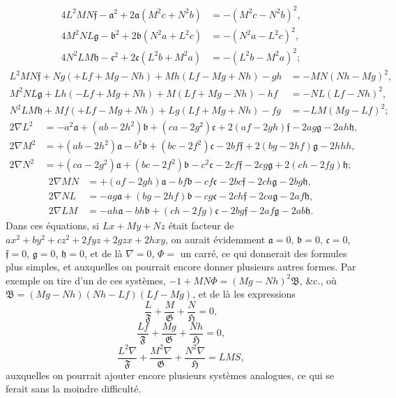 \documentclass[11pt]{article}
\begin{document}
\begin{align*}
4 L^{2} M N\mathfrak{f} - \mathfrak{a}^{2} + 2 \mathfrak{a}(M^{2} c + N^{2} b) &= -(M^{2} c - N^{2} b)^{2},\\
4 M^{2} N L\mathfrak{g} - \mathfrak{b}^{2} + 2 \mathfrak{b}(N^{2} a + L^{2} c) &= -(N^{2} a - L^{2} c)^{2},\\
4 N^{2} L M\mathfrak{h} - \mathfrak{c}^{2} + 2 \mathfrak{c}(L^{2} b + M^{2} a) &= -(L^{2} b - M^{2} a)^{2};
\end{align*}
\begin{align*}
L^{2} M N\mathfrak{f} + N g(+ L f + M g - N h) + M h(L f - M g + N h) - g h &= -M N(N h - M g)^{2},\\
M^{2} N L\mathfrak{g} + L h(-L f + M g + N h) + M(L f + M g - N h) - h f &= -N L(L f - N h)^{2},\\
N^{2} L M\mathfrak{h} + M f(+ L f - M g + N h) + L g(L f + M g + N h) - f g &= -L M(M g - L f)^{2};
\end{align*}
\begin{align*}
2 \nabla L^{2} &= -a^{2}\mathfrak{a} + (a b - 2 h^{2})\mathfrak{b} + (c a - 2 g^{2})\mathfrak{c} + 2(a f - 2 g h)\mathfrak{f} - 2 a g\mathfrak{g} - 2 a h\mathfrak{h},\\
2 \nabla M^{2} &= +(a b - 2 h^{2})\mathfrak{a} - b^{2}\mathfrak{b} + (b c - 2 f^{2})\mathfrak{c} - 2 b f\mathfrak{f} + 2(b g - 2 h f)\mathfrak{g} - 2 h h h,\\
2 \nabla N^{2} &= +(c a - 2 g^{2})\mathfrak{a} + (b c - 2 f^{2})\mathfrak{b} - c^{2}\mathfrak{c} - 2 c f\mathfrak{f} - 2 c g\mathfrak{g} + 2(c h - 2 f g)\mathfrak{h};
\end{align*}
\begin{align*}
2 \nabla M N &= +(a f - 2 g h)\mathfrak{a} - b f\mathfrak{b} - c f\mathfrak{c} - 2 b c\mathfrak{f} - 2 c h\mathfrak{g} - 2 b g\mathfrak{h},\\
2 \nabla N L &= -a g\mathfrak{a} + (b g - 2 h f)\mathfrak{b} - c g\mathfrak{c} - 2 c h\mathfrak{f} - 2 c a\mathfrak{g} - 2 a f\mathfrak{h},\\
2 \nabla L M &= -a h\mathfrak{a} - b h\mathfrak{b} + (c h - 2 f g)\mathfrak{c} - 2 b g\mathfrak{f} - 2 a f\mathfrak{g} - 2 a b\mathfrak{h}.
\end{align*}
Dans ces \'equations, si $L x + M y + N z$ \'etait facteur de $a x^{2} + b y^{2} + c z^{2} + 2 f y z + 2 g z x + 2 h x y$,
on aurait \'evidemment $\mathfrak{a} = 0$, $\mathfrak{b} = 0$, $\mathfrak{c} = 0$, $\mathfrak{f} = 0$, $\mathfrak{g} = 0$, $\mathfrak{h} = 0$, et de l\`a $\nabla = 0$, $\Phi = $ un carr\'e,
ce qui donnerait des formules plus simples, et auxquelles on pourrait encore donner
plusieurs autres formes. Par exemple on tire d'un de ces syst\`emes, $-1 + M N\Phi = (M g - N h)^{2}\mathfrak{B}$,
\&c., o\`u $\mathfrak{B} = (M g - N h)(N h - L f)(L f - M g)$, et de l\`a les expressions
\[
\frac{L}{\mathfrak{F}} + \frac{M}{\mathfrak{G}} + \frac{N}{\mathfrak{H}} = 0,
\]
\[
\frac{L f}{\mathfrak{F}} + \frac{M g}{\mathfrak{G}} + \frac{N h}{\mathfrak{H}} = 0,
\]
\[
\frac{L^{2} \nabla}{\mathfrak{F}} + \frac{M^{2} \nabla}{\mathfrak{G}} + \frac{N^{2} \nabla}{\mathfrak{H}} = L M S,
\]
auxquelles on pourrait ajouter encore plusieurs syst\`emes analogues, ce qui se ferait sans
la moindre difficult\'e.
\end{document}
